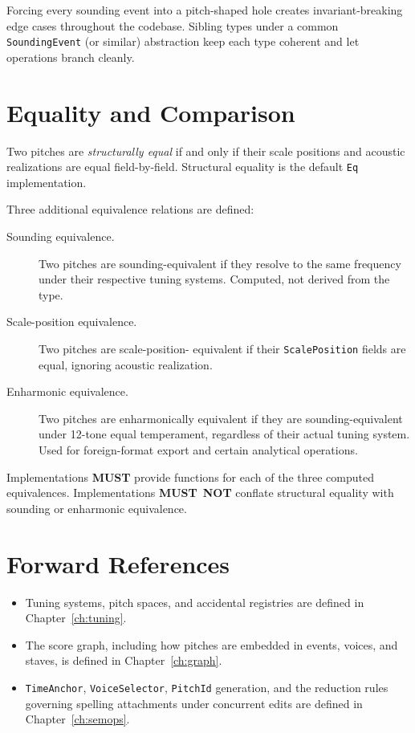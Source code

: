 \documentclass[11pt,letterpaper]{report}
\newcounter{requirement}[chapter]
\newcommand{\MUST}{\textbf{MUST}}
\newcommand{\MUSTNOT}{\textbf{MUST}\nobreak\ \textbf{NOT}}
\begin{document}
\begin{rationale}
  Forcing every sounding event into a pitch-shaped hole creates
  invariant-breaking edge cases throughout the codebase. Sibling types
  under a common \texttt{SoundingEvent} (or similar) abstraction keep
  each type coherent and let operations branch cleanly.
\end{rationale}

\section{Equality and Comparison}
\label{sec:pitch:eq}

Two pitches are \emph{structurally equal} if and only if their scale
positions and acoustic realizations are equal field-by-field. Structural
equality is the default \texttt{Eq} implementation.

Three additional equivalence relations are defined:

\begin{description}
  \item[Sounding equivalence.] Two pitches are sounding-equivalent if
    they resolve to the same frequency under their respective tuning
    systems. Computed, not derived from the type.
  \item[Scale-position equivalence.] Two pitches are scale-position-
    equivalent if their \texttt{ScalePosition} fields are equal, ignoring
    acoustic realization.
  \item[Enharmonic equivalence.] Two pitches are enharmonically
    equivalent if they are sounding-equivalent under 12-tone equal
    temperament, regardless of their actual tuning system. Used for
    foreign-format export and certain analytical operations.
\end{description}

\begin{requirement}
  \label{req:pitch:pitch-equivalence-functions}
  Implementations \MUST{} provide functions for each of the three
  computed equivalences. Implementations \MUSTNOT{} conflate structural
  equality with sounding or enharmonic equivalence.
\end{requirement}

\section{Forward References}

\begin{itemize}
  \item Tuning systems, pitch spaces, and accidental registries are
    defined in Chapter~\ref{ch:tuning}.
  \item The score graph, including how pitches are embedded in events,
    voices, and staves, is defined in Chapter~\ref{ch:graph}.
  \item \texttt{TimeAnchor}, \texttt{VoiceSelector}, \texttt{PitchId}
    generation, and the reduction rules governing spelling
    attachments under concurrent edits are defined in
    Chapter~\ref{ch:semops}.
\end{itemize}
\end{document}
